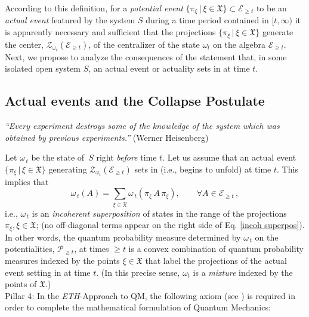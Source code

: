 \documentclass[12pt]{article}
\begin{document}
According to this definition, for a \textit{potential event} 
$\big\{\pi_{\xi}\,\vert\, \xi \in \mathfrak{X}\big\}\subset \mathcal{E}_{\geq t}$ to be an
\textit{actual event} featured by the system $S$ during a time period contained in $[t, \infty)$ it is apparently necessary 
and sufficient that the projections $\big\{\pi_{\xi}\,\vert\, \xi \in \mathfrak{X}\big\}$ generate the center, 
$\mathcal{Z}_{\omega_t}(\mathcal{E}_{\geq t})$, of the centralizer of the state $\omega_t$ on the algebra 
$\mathcal{E}_{\geq t}$.\\ 

Next, we propose to analyze the consequences of the statement that, in some isolated open system $S$, 
an actual event or actuality sets in at time $t$. 

\subsection{Actual events and the Collapse Postulate}

\hspace{0.5cm}\textit{``Every experiment destroys some of the knowledge of the system which was obtained by previous experiments.''} (Werner Heisenberg)

Let $\omega_{\,t}$ be the state of~$S$ right \textit{before} time $t$. Let us assume that an actual event
 $\big\{ \pi_{\xi} \,|\, \xi \in \mathfrak{X} \big\}$ generating $\mathcal{Z}_{\omega_t}(\mathcal{E}_{\geq t})$ sets in (i.e., begins to unfold) at time $t$. This implies that
 \begin{equation}\label{incoh superpos}
 \omega_{\,t}(A)= \sum_{\xi \in \mathfrak{X}} \omega_{\,t}(\pi_{\xi} \,A\, \pi_{\xi}), \qquad \forall A \in \mathcal{E}_{\geq t}\,,
 \end{equation}
 i.e., $\omega_{\,t}$ is an \textit{incoherent superposition} of states in the range of the projections 
 $\pi_{\xi}, \xi \in \mathfrak{X}$; (no off-diagonal terms appear on the right side of Eq. \eqref{incoh superpos}). In other words, the quantum probability measure determined by $\omega_{\,t}$ on the potentialities, $\mathcal{P}_{\geq t}$, at times $\geq t$ is a convex combination of quantum probability measures indexed by the points $\xi \in \mathfrak{X}$ that label the projections of the actual event setting in at time $t$. (In this precise sense, $\omega_t$ is a \textit{mixture} indexed by the points of $\mathfrak{X}$.)\\
 
{Pillar 4}:  In the \textit{ETH}-Approach to QM, the following axiom (see \cite{Fr1}) is required in order to complete the mathematical formulation of Quantum Mechanics:
\end{document}
